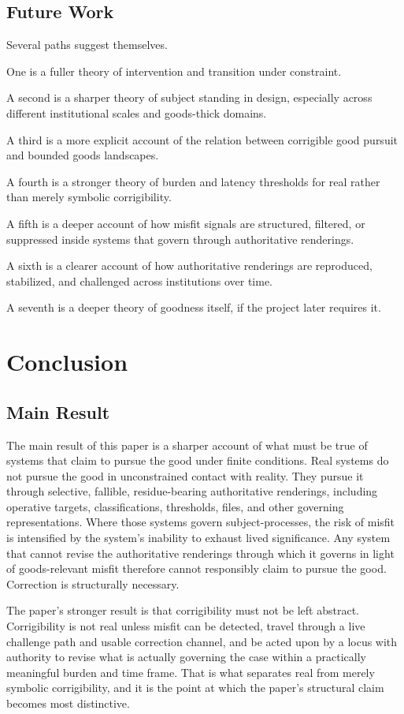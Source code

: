 \documentclass[11pt]{article}
\begin{document}
\subsection{Future Work}

Several paths suggest themselves.

One is a fuller theory of intervention and transition under constraint.

A second is a sharper theory of subject standing in design, especially across different institutional scales and goods-thick domains.

A third is a more explicit account of the relation between corrigible good pursuit and bounded goods landscapes.

A fourth is a stronger theory of burden and latency thresholds for real rather than merely symbolic corrigibility.

A fifth is a deeper account of how misfit signals are structured, filtered, or suppressed inside systems that govern through authoritative renderings.

A sixth is a clearer account of how authoritative renderings are reproduced, stabilized, and challenged across institutions over time.

A seventh is a deeper theory of goodness itself, if the project later requires it.
\section{Conclusion}

\subsection{Main Result}

The main result of this paper is a sharper account of what must be true of systems that claim to pursue the good under finite conditions. Real systems do not pursue the good in unconstrained contact with reality. They pursue it through selective, fallible, residue-bearing authoritative renderings, including operative targets, classifications, thresholds, files, and other governing representations. Where those systems govern subject-processes, the risk of misfit is intensified by the system's inability to exhaust lived significance. Any system that cannot revise the authoritative renderings through which it governs in light of goods-relevant misfit therefore cannot responsibly claim to pursue the good. Correction is structurally necessary.

The paper's stronger result is that corrigibility must not be left abstract. Corrigibility is not real unless misfit can be detected, travel through a live challenge path and usable correction channel, and be acted upon by a locus with authority to revise what is actually governing the case within a practically meaningful burden and time frame. That is what separates real from merely symbolic corrigibility, and it is the point at which the paper's structural claim becomes most distinctive.
\end{document}
